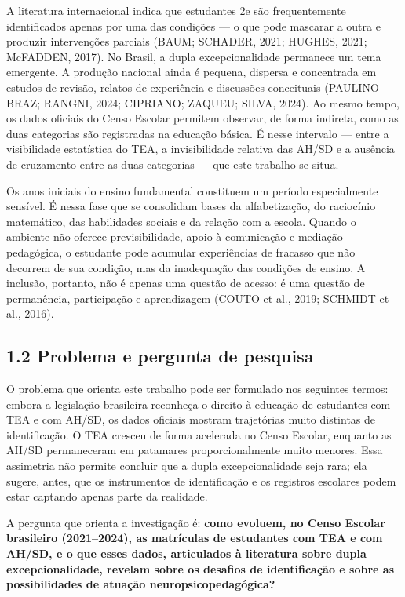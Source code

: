 A literatura internacional indica que estudantes 2e são frequentemente
identificados apenas por uma das condições --- o que pode mascarar a
outra e produzir intervenções parciais (BAUM; SCHADER, 2021; HUGHES,
2021; McFADDEN, 2017). No Brasil, a dupla excepcionalidade permanece um
tema emergente. A produção nacional ainda é pequena, dispersa e
concentrada em estudos de revisão, relatos de experiência e discussões
conceituais (PAULINO BRAZ; RANGNI, 2024; CIPRIANO; ZAQUEU; SILVA, 2024).
Ao mesmo tempo, os dados oficiais do Censo Escolar permitem observar, de
forma indireta, como as duas categorias são registradas na educação
básica. É nesse intervalo --- entre a visibilidade estatística do TEA, a
invisibilidade relativa das AH/SD e a ausência de cruzamento entre as
duas categorias --- que este trabalho se situa.

Os anos iniciais do ensino fundamental constituem um período
especialmente sensível. É nessa fase que se consolidam bases da
alfabetização, do raciocínio matemático, das habilidades sociais e da
relação com a escola. Quando o ambiente não oferece previsibilidade,
apoio à comunicação e mediação pedagógica, o estudante pode acumular
experiências de fracasso que não decorrem de sua condição, mas da
inadequação das condições de ensino. A inclusão, portanto, não é apenas
uma questão de acesso: é uma questão de permanência, participação e
aprendizagem (COUTO et al., 2019; SCHMIDT et al., 2016).

\subsection{1.2 Problema e pergunta de
pesquisa}\label{problema-e-pergunta-de-pesquisa}

O problema que orienta este trabalho pode ser formulado nos seguintes
termos: embora a legislação brasileira reconheça o direito à educação de
estudantes com TEA e com AH/SD, os dados oficiais mostram trajetórias
muito distintas de identificação. O TEA cresceu de forma acelerada no
Censo Escolar, enquanto as AH/SD permaneceram em patamares
proporcionalmente muito menores. Essa assimetria não permite concluir
que a dupla excepcionalidade seja rara; ela sugere, antes, que os
instrumentos de identificação e os registros escolares podem estar
captando apenas parte da realidade.

A pergunta que orienta a investigação é: \textbf{como evoluem, no Censo
Escolar brasileiro (2021--2024), as matrículas de estudantes com TEA e
com AH/SD, e o que esses dados, articulados à literatura sobre dupla
excepcionalidade, revelam sobre os desafios de identificação e sobre as
possibilidades de atuação neuropsicopedagógica?}

